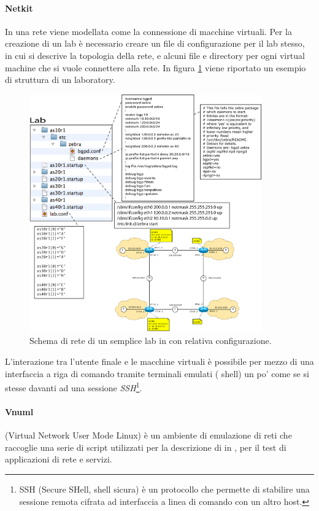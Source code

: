 \paragraph{Netkit}In \netkit{} una rete viene modellata come la connessione di macchine virtuali. Per la creazione di un lab è necessario creare un file di configurazione per il lab stesso, in cui si descrive la topologia della rete, e alcuni file e directory per ogni virtual machine che si vuole connettere alla rete. In figura \ref{figura:netkit_lab} viene riportato un esempio di struttura di un \netkit{} laboratory.

\begin{figure}[!ht]
	\centering
	\includegraphics[width=10cm]{images/netkit_lab.png}
	\caption{Schema di rete di un semplice lab in \netkit{} con relativa configurazione.}
	\label{figura:netkit_lab}
\end{figure}

L'interazione tra l'utente finale e le macchine virtuali è possibile per mezzo di una interfaccia a riga di comando tramite terminali emulati (\linux{} shell) un po' come se si stesse davanti ad una sessione \emph{SSH}\footnote{SSH (Secure SHell, shell sicura) è un protocollo che permette di stabilire una sessione remota cifrata ad interfaccia a linea di comando con un altro host.}.


\paragraph{Vnuml}\cite{VNUMLT} (Virtual Network User Mode Linux) è un ambiente di emulazione di reti che raccoglie una serie di script utilizzati per la descrizione di \testbed{} in \xml{}, per il test di applicazioni di rete e servizi.


